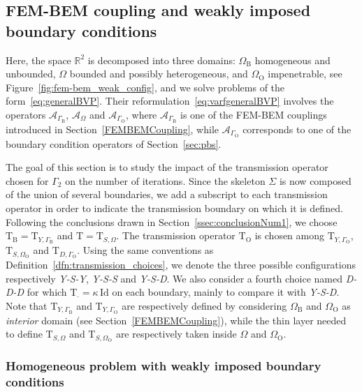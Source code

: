 \documentclass[a4paper,11pt]{article}
\newcommand{\RR}{\mathbb{R}}
\newcommand{\Id}{\mathrm{Id}}
\newcommand{\mT}{\mathrm{T}}
\newcommand{\DespresDespresDespres}{\textit{D-D-D}}
\newcommand{\YukawaSchurDespres}{\textit{Y-S-D}}
\newcommand{\YukawaSchurSchur}{\textit{Y-S-S}}
\newcommand{\YukawaSchurYukawa}{\textit{Y-S-Y}}
\begin{document}
\subsection{FEM-BEM coupling and weakly imposed boundary conditions}\label{ssec:fem-bem-weak}
Here, the space \(\RR^2\) is decomposed into three domains: \(\Omega_{\text{B}}\) homogeneous and unbounded, \(\Omega\) bounded and possibly heterogeneous, and \(\Omega_{\text{O}}\) impenetrable, see Figure~\ref{fig:fem-bem_weak_config}, and
we solve problems of the form~\eqref{eq:generalBVP}. Their reformulation~\eqref{eq:varfgeneralBVP} involves the operators \(\mathcal{A}_{\Gamma_{\text{B}}}\), \(\mathcal{A}_{\Omega}\) and \(\mathcal{A}_{\Gamma_{\text{O}}}\), where \(\mathcal{A}_{\Gamma_{\text{B}}}\) is one of the FEM-BEM couplings introduced in Section~\ref{FEMBEMCoupling}, while \(\mathcal{A}_{\Gamma_{\text{O}}}\) corresponds to one of the boundary condition operators of Section~\ref{sec:pbs}.

The goal of this section is to study the impact of the transmission operator chosen for \(\Gamma_2\) on the number of iterations. Since the skeleton \(\Sigma\) is now composed of the union of several boundaries, we add a subscript to each transmission operator in order to indicate the transmission boundary on which it is defined. Following the conclusions drawn in Section~\ref{ssec:conclusionNum1}, we choose \(\mT_{\text{B}} = \mT_{Y,\Gamma_{\text{B}}}\) and \(\mT = \mT_{S, \Omega}\). 
The transmission operator \(\mT_{\text{O}}\) is chosen among \(\mT_{Y,\Gamma_{\text{O}}}\), \(\mT_{S, \Omega_{\text{O}}}\) and \(\mT_{D, \Gamma_{\text{O}}}\). 
Using the same conventions as Definition~\ref{dfn:transmission_choices}, we denote the three possible configurations respectively \YukawaSchurYukawa, \YukawaSchurSchur{} and \YukawaSchurDespres.
We also consider a fourth choice named \DespresDespresDespres{} for which \(\mT_{\cdot} = \kappa\, \Id\) on each boundary, mainly to compare it with \YukawaSchurDespres.
Note that \(\mT_{Y,\Gamma_{\text{B}}}\) and \(\mT_{Y,\Gamma_{\text{O}}}\) are respectively defined by considering \(\Omega_{\text{B}}\) and \(\Omega_{\text{O}}\) as \emph{interior} domain (see Section~\ref{FEMBEMCoupling}), while the thin layer needed to define \(\mT_{S, \Omega}\) and \(\mT_{S, \Omega_{\text{O}}}\) are respectively taken inside \(\Omega\) and \(\Omega_{\text{O}}\).

\subsubsection{Homogeneous problem with weakly imposed boundary conditions}\label{sssec:fem-bem-weak-toy}
\end{document}
